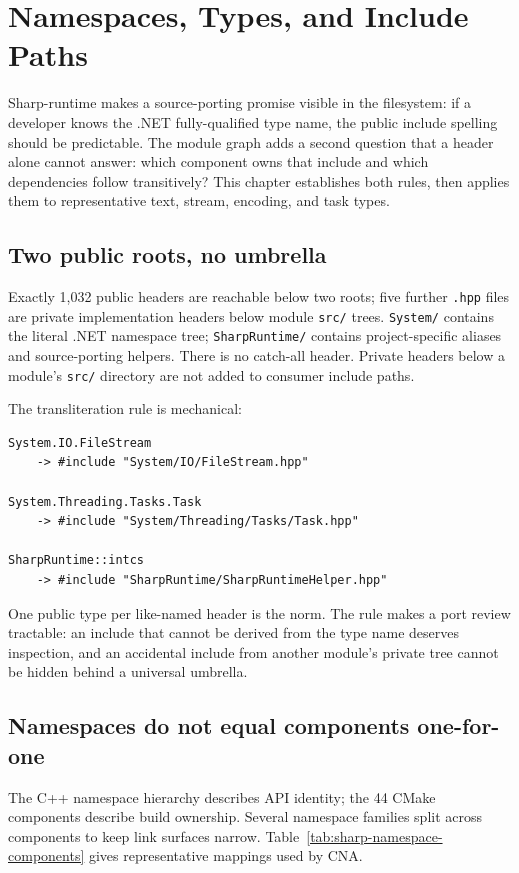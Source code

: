 \chapter{Namespaces, Types, and Include Paths}
\label{ch:sharp-runtime-namespaces}

Sharp-runtime makes a source-porting promise visible in the filesystem: if a developer knows
the .NET fully-qualified type name, the public include spelling should be predictable. The
module graph adds a second question that a header alone cannot answer: which component owns
that include and which dependencies follow transitively? This chapter establishes both rules,
then applies them to representative text, stream, encoding, and task types.

\section{Two public roots, no umbrella}

Exactly 1{,}032 public headers are reachable below two roots; five further \texttt{.hpp} files
are private implementation headers below module \texttt{src/} trees. \texttt{System/} contains
the literal .NET namespace tree; \texttt{SharpRuntime/} contains project-specific aliases and
source-porting helpers. There is no catch-all header. Private headers below a module's
\texttt{src/} directory are not added to consumer include paths.

The transliteration rule is mechanical:

\begin{lstlisting}
System.IO.FileStream
    -> #include "System/IO/FileStream.hpp"

System.Threading.Tasks.Task
    -> #include "System/Threading/Tasks/Task.hpp"

SharpRuntime::intcs
    -> #include "SharpRuntime/SharpRuntimeHelper.hpp"
\end{lstlisting}

One public type per like-named header is the norm. The rule makes a port review tractable: an
include that cannot be derived from the type name deserves inspection, and an accidental
include from another module's private tree cannot be hidden behind a universal umbrella.

\section{Namespaces do not equal components one-for-one}

The C++ namespace hierarchy describes API identity; the 44 CMake components describe build
ownership. Several namespace families split across components to keep link surfaces narrow.
Table~\ref{tab:sharp-namespace-components} gives representative mappings used by CNA.

